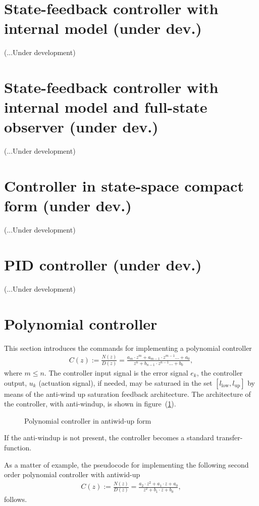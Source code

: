 \documentclass[12pt]{Template_}
\begin{document}
\newpage
\section{State-feedback controller with internal model (under dev.)}
(...Under development)

\section{State-feedback controller with internal model and full-state observer (under dev.)}
(...Under development)

\section{Controller in state-space compact form (under dev.)}
(...Under development)

\section{PID controller (under dev.)}
(...Under development)

\newpage
\section{Polynomial controller}
This section introduces the commands for implementing a polynomial controller
\begin{eqnarray*}
 C(z) := \frac{N(z)}{D(z)} = \frac{a_m\cdot z^m+ a_{m-1}\cdot z^{m-1}\ldots + a_0}{z^n+ b_{n-1}\cdot z^{n-1}\ldots + b_0},
\end{eqnarray*}
where $m\leq n$. The controller input signal is the error signal $e_k$, the controller output, $u_k$ (actuation signal), if needed, may be saturaed in the set $\left[ l_{\mathrm{low}},l_{\mathrm{up}} \right]$ 
by means of the anti-wind up saturation feedback architecture. The architecture of the controller, with anti-windup, is shown in figure~(\ref{fig:poly_ctr_aw}).
\begin{figure}[htb]
\begin{center}

\vspace{-3mm}
\caption{Polynomial controller in antiwid-up form}
\label{fig:poly_ctr_aw}
\end{center}
\end{figure}
If the anti-windup is not present, the controller becomes a standard transfer-function.

As a matter of example, the pseudocode for implementing the following second order polynomial controller with antiwid-up
\begin{eqnarray*}
 C(z) := \frac{N(z)}{D(z)} = \frac{a_2\cdot z^2+a_1\cdot z+a_0}{z^2+b_1\cdot z+b_0},
\end{eqnarray*}
follows.
\end{document}
